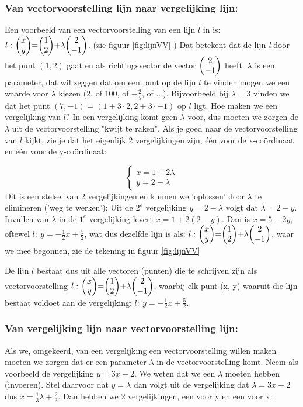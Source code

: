 \subsubsection{Van vectorvoorstelling lijn naar vergelijking lijn:} 
Een voorbeeld van een  vectorvoorstelling van een lijn $ l $ in \RT  is:
$ l: \ \vectwee {x}{y} = \vectwee {1}{2} + \lambda  \vectwee {2}{-1}  $.   (zie figuur \ref{fig:lijnVV} ) Dat betekent dat de lijn\textit{ l} door het punt $ (1,2) $ gaat en als richtingsvector de vector $ \vectwee {2}{-1} $ heeft. $ \lambda $  is een parameter, dat wil zeggen dat om een punt op de lijn $ l $ te vinden mogen we een waarde voor $ \lambda $  kiezen (2, of 100, of $ -\frac{2}{5} $, of ...). Bijvoorbeeld bij  $ \lambda= 3 $ vinden we dat het punt $(7,-1) = (1 + 3\cdot2 , 2 + 3\cdot-1)$   op $ l $ ligt. Hoe maken we een vergelijking van  $ l $? In een vergelijking komt geen $ \lambda $ voor, dus moeten we zorgen de $ \lambda $ uit de vectorvoorstelling "kwijt te raken". Als je goed naar de vectorvoorstelling van $ l $ kijkt, zie je dat het eigenlijk 2 vergelijkingen zijn, één voor de x-coördinaat en één voor de y-coördinaat:

\[\begin{cases}
x = 1 + 2\lambda\\
y = 2 - \lambda 
\end{cases}
\] 
Dit is een stelsel van 2 vergelijkingen  en kunnen we 'oplossen' door $ \lambda $ te elimineren ('weg te werken'):
Uit de $ 2^{e}$ vergelijking $ y = 2 - \lambda $ volgt  dat $\lambda = 2 - y $. Invullen van  $ \lambda $ in de $ 1^{e}$ vergelijking levert $ x = 1 +2(2-y) $. Dan is $ x= 5 -2y $, oftewel $ l:  \ y = - \frac{1}{2}x + \frac{5}{2} $,  wat dus dezelfde lijn is als: $ l: \ \vectwee {x}{y} = \vectwee {1}{2} + \lambda  \vectwee {2}{-1}  $, waar we mee begonnen, zie de tekening in  figuur  \ref{fig:lijnVV}


De lijn $l$ bestaat dus uit alle vectoren (punten) die te schrijven zijn als vectorvoorstelling $ l: \ \vectwee {x}{y} = \vectwee {1}{2} + \lambda  \vectwee {2}{-1}  $, waarbij elk punt (x, y) waaruit die lijn bestaat voldoet aan de vergelijking: $ l:  \ y = - \frac{1}{2}x + \frac{5}{2} $.

\subsubsection{Van vergelijking lijn naar vectorvoorstelling lijn:}
Als we, omgekeerd, van een vergelijking een vectorvoorstelling willen maken moeten we zorgen dat er een parameter $ \lambda $ in de vectorvoorstelling komt. Neem als voorbeeld de vergelijking $ y = 3x - 2 $. We weten dat we een $ \lambda $ moeten hebben (invoeren). Stel daarvoor dat $ y =  \lambda $ dan volgt uit de vergelijking  dat $ \lambda = 3x -2 $ dus $ x = \frac{1}{3}  \lambda  + \frac{2}{3} $. Dan hebben we  2 vergelijkingen, een voor y en een voor x:

